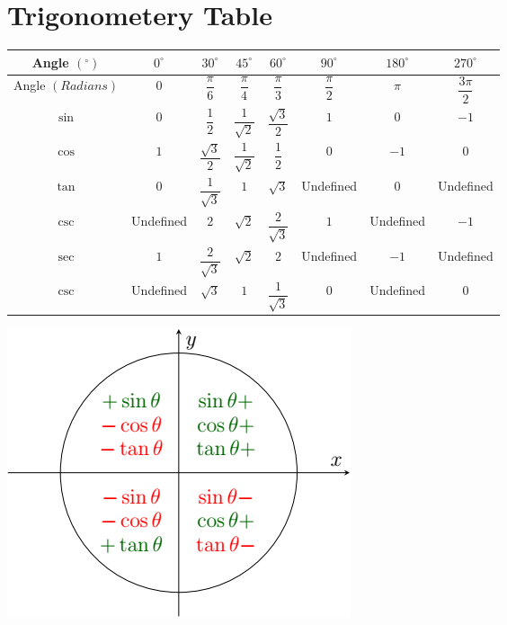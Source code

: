\documentclass{article}
\begin{document}
\LARGE
\section{Trigonometery Table}
\centering
\renewcommand{\arraystretch}{2}
\newcommand\Bstrut{\rule[-1.3em]{0pt}{0pt}}  

\begin{tabular}{|c|c|c|c|c|c|c|c|}
    \hline
    Angle $(^\circ)$ & $0^\circ$ & $30^\circ$ & $45^\circ$ & $60^\circ$ & $90^\circ$ & $180^\circ$ & $270^\circ$\Bstrut\\
    \hline
    Angle $(Radians)$ & $0$ & $\dfrac{\pi}{6}$ & $\dfrac{\pi}{4}$ & $\dfrac{\pi}{3}$ & $\dfrac{\pi}{2}$ & $\pi$ & $\dfrac{3\pi}{2}$ \Bstrut\\
    \hline
        $\sin$ & $0$ & 
        $\dfrac{1}{2}$ & 
        $\dfrac{1}{\sqrt{2}}$ & 
        $\dfrac{\sqrt{3}}{2}$ & 
        $1$ & 
        $0$ & 
        $-1$ 
        \Bstrut\\
    \hline
        $\cos$ & $1$ & 
        $\dfrac{\sqrt{3}}{2}$ & 
        $\dfrac{1}{\sqrt{2}}$ & 
        $\dfrac{1}{2}$ & 
        $0$ & 
        $-1$ & 
        $0$ 
        \Bstrut\\
    \hline
        $\tan$ & $0$ & 
        $\dfrac{1}{\sqrt{3}}$ & 
        $1$ & 
        $\sqrt{3}$ & 
        Undefined & 
        $0$ & 
        Undefined 
        \Bstrut\\
    \hline
        $\csc$ & Undefined & 
        $2$ & 
        $\sqrt{2}$ & 
        $\dfrac{2}{\sqrt{3}}$ & 
        $1$ & 
        Undefined & 
        $-1$ 
        \Bstrut\\
    \hline
        $\sec$ & $1$ & 
        $\dfrac{2}{\sqrt{3}}$ & 
        $\sqrt{2}$ & 
        $2$ & 
        Undefined &
        $-1$ &
        Undefined 
        \Bstrut\\
    \hline
        $\csc$ & Undefined & 
        $\sqrt{3}$ & 
        $1$ & 
        $\dfrac{1}{\sqrt{3}}$ & 
        $0$ & 
        Undefined & 
        $0$ 
        \Bstrut\\
    \hline
\end{tabular}
\includegraphics{images/trig-quadrants.png} \\
\end{document}
